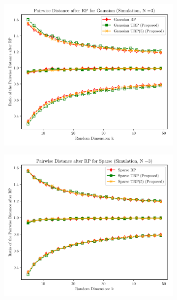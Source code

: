 \begin{figure}[ht!] 
	\centering
	\begin{subfigure}{0.32\textwidth}
		\includegraphics[scale = 0.3]{figure/dist_g_d125000.pdf}
	\end{subfigure}
	\begin{subfigure}{0.32\textwidth}
		\includegraphics[scale = 0.3]{figure/dist_sp0_d125000.pdf}
	\end{subfigure}
	\begin{subfigure}{0.32\textwidth}

\end{subfigure}
\end{figure}
